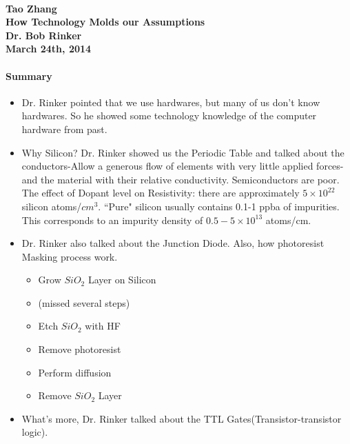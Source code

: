 \documentclass[12pt]{article}
\begin{document}
\paragraph{Tao Zhang\\How Technology Molds our Assumptions\\Dr. Bob Rinker\\March 24th, 2014}

\paragraph{Summary}

\begin{itemize}
\item Dr. Rinker pointed that we use hardwares, but many of us don't know hardwares. So he showed some technology knowledge of the computer hardware from past.
\item Why Silicon? Dr. Rinker showed us the Periodic Table and talked about the conductors-Allow a generous flow of elements with very little applied forces-and the material with their relative conductivity. Semiconductors are poor. The effect of Dopant level on Resistivity: there are approximately $5 \times 10^{22}$ silicon atoms/$cm^3$. ``Pure" silicon usually contains 0.1-1 ppba of impurities. This corresponds to an impurity density of $0.5 - 5 \times 10^{13}$ atoms/cm.
\item Dr. Rinker also talked about the Junction Diode. Also, how photoresist Masking process work.
\begin{itemize}
	\item Grow $SiO_2$ Layer on Silicon
	\item (missed several steps)
	\item Etch $SiO_2$ with HF
	\item Remove photoresist
	\item Perform diffusion
	\item Remove $SiO_2$ Layer
\end{itemize}

\item What's more, Dr. Rinker talked about the TTL Gates(Transistor-transistor logic).

\end{itemize}
\end{document}
